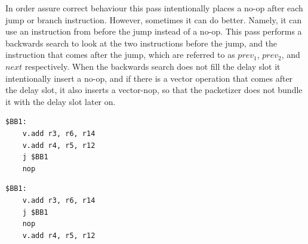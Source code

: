 In order assure correct behaviour this pass intentionally 
places a no-op after each jump or branch instruction. However, sometimes it can do better. Namely, it can use an instruction from before the jump instead of a no-op. This pass performs a backwards search to look at the two instructions before the jump, and the instruction that comes after the jump, which are referred to as $prev_1$, $prev_2$, and $next$ respectively. When the backwards search does not fill the delay slot it intentionally insert a no-op, and if there is a vector operation that comes after the delay slot, it also inserts a vector-nop, so that the packetizer does not bundle it with the delay slot later on.



\label{lst:delayslot1}
\begin{center}
\hspace{2px}\begin{minipage}{.475\textwidth}
\begin{lstlisting}[frame=tlrb]
$BB1:
    v.add r3, r6, r14
    v.add r4, r5, r12
    j $BB1
    nop
\end{lstlisting}
\end{minipage}\hfill
\begin{minipage}{.475\textwidth}
\begin{lstlisting}[frame=tlrb]
$BB1:
    v.add r3, r6, r14
    j $BB1
    nop
    v.add r4, r5, r12
\end{lstlisting}
\end{minipage}
\end{center}


